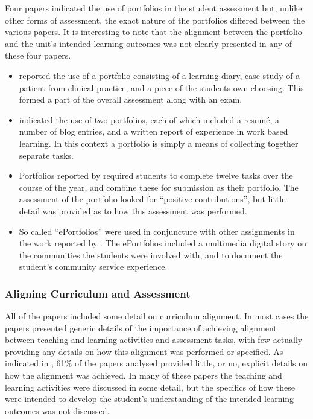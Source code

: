 Four papers indicated the use of portfolios in the student assessment but, unlike other forms of assessment, the exact nature of the portfolios differed between the various papers. It is interesting to note that the alignment between the portfolio and the unit's intended learning outcomes was not clearly presented in any of these four papers.

\begin{itemize}[noitemsep,nolistsep]
	\item \citet{Tang:1999} reported the use of a portfolio consisting of a learning diary, case study of a patient from clinical practice, and a piece of the students own choosing. This formed a part of the overall assessment along with an exam.
	\item \citet{raeburn2009blended} indicated the use of two portfolios, each of which included a resum\'{e}, a number of blog entries, and a written report of experience in work based learning. In this context a portfolio is simply a means of collecting together separate tasks.
	\item Portfolios reported by \citet{scott2009promoting} required students to complete twelve tasks over the course of the year, and combine these for submission as their portfolio. The assessment of the portfolio looked for ``positive contributions'', but little detail was provided as to how this assessment was performed.
	\item So called ``ePortfolios'' were used in conjuncture with other assignments in the work reported by \citet{donnisonre}. The ePortfolios included a multimedia digital story on the communities the students were involved with, and to document the student's community service experience.
\end{itemize}



\subsubsection{Aligning Curriculum and Assessment} %
\label{sub:aligning_curriculum}

All of the papers included some detail on curriculum alignment. In most cases the papers presented generic details of the importance of achieving alignment between teaching and learning activities and assessment tasks, with few actually providing any details on how this alignment was performed or specified. As indicated in , 61\% of the papers analysed provided little, or no, explicit details on how the alignment was achieved. In many of these papers the teaching and learning activities were discussed in some detail, but the specifics of how these were intended to develop the student's understanding of the intended learning outcomes was not discussed.


